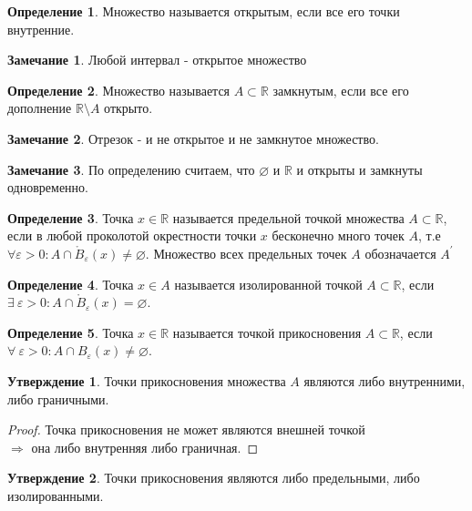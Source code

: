 \documentclass[a4paper, 12pt]{article}
\newcommand{\R}{\mathbb{R}}
\renewcommand{\epsilon}{\varepsilon}
\renewcommand{\emptyset}{\varnothing}
\theoremstyle{definition}
\newtheorem*{definition}{Определение}
\newtheorem*{comm}{Замечание}
\newtheorem*{statement}{Утверждение}
\begin{document}
        \begin{definition}
            Множество называется открытым, если все его точки внутренние.
        \end{definition}
        \begin{comm}
            Любой интервал - открытое множество
        \end{comm}
        \begin{definition}
            Множество называется $A\subset \R$ замкнутым, если все его дополнение $\R\setminus A$ открыто.
        \end{definition} 
        \begin{comm}
            Отрезок - и не открытое и не замкнутое множество.
        \end{comm}
        \begin{comm}
            По определению считаем, что $\emptyset$ и $\R$ и открыты и замкнуты одновременно.
        \end{comm} 
        \begin{definition}
            Точка $x\in \R$ называется предельной точкой множества $A\subset \R$, если в любой проколотой окрестности точки $x$ бесконечно много точек $A$, т.е\\
            $\forall \epsilon >0: A\cap \mathring{B}_{\epsilon}(x)\ne\emptyset$. Множество всех предельных точек $A$ обозначается $A^{\prime}$
        \end{definition} 
        \begin{definition}
            Точка $x\in A$ называется изолированной точкой $A\subset \R$, если $\exists \ \epsilon>0: A\cap \mathring{B}_{\epsilon}(x)=\emptyset$.
        \end{definition} 
        \begin{definition}
            Точка $x\in \R$ называется точкой прикосновения $A\subset \R$, если $\forall \ \epsilon>0: A\cap {B}_{\epsilon}(x)\ne\emptyset$.
        \end{definition} 
        \begin{statement}
            Точки прикосновения множества $A$ являются либо внутренними, либо граничными.
        \end{statement}
        \begin{proof}
            Точка прикосновения не может являются внешней точкой\\
            $\Rightarrow$ она либо внутренняя либо граничная.
        \end{proof}
        \begin{statement}
            Точки прикосновения являются либо предельными, либо изолированными.
        \end{statement}  
\end{document}
